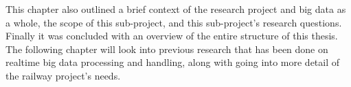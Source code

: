 This chapter also outlined a brief context of the research project and big data as a whole, the scope of this sub-project,
and this sub-project's research questions. Finally it was concluded with an overview of the entire structure of this thesis. The
following chapter will look into previous research that has been done on realtime big data processing and handling,
along with going into more detail of the railway project's needs.

